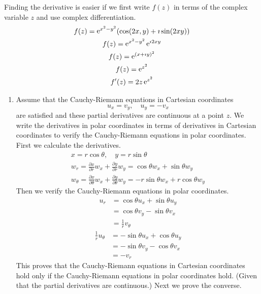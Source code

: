 {\begin{Solution}
\begin{enumerate}
    Finding the derivative is easier if we first write $f(z)$
    in terms of the complex variable $z$ and use complex differentiation.
    \begin{gather*}
      f(z) = \mathop{\mathrm{e}}\nolimits^{x^2 - y^2} ( \cos(2 x, y) + \imath \sin(2 x y) )
      \\
      f(z) = \mathop{\mathrm{e}}\nolimits^{x^2 - y^2} \mathop{\mathrm{e}}\nolimits^{\imath 2 x y}
      \\
      f(z) = \mathop{\mathrm{e}}\nolimits^{(x + \imath y)^2}
      \\
      f(z) = \mathop{\mathrm{e}}\nolimits^{z^2}
      \\
      f'(z) = 2 z \mathop{\mathrm{e}}\nolimits^{z^2}
    \end{gather*}
  \end{enumerate}
\end{Solution}









\begin{Solution}
  \label{solution cartesian cr polar cr}
  \begin{enumerate}
  \item 
    Assume that the Cauchy-Riemann equations in Cartesian coordinates
    \[
    u_x = v_y, \quad u_y = - v_x
    \]
    are satisfied and these partial derivatives are continuous at a point $z$.
    We write the derivatives in polar coordinates in terms of derivatives
    in Cartesian coordinates to verify the Cauchy-Riemann equations in 
    polar coordinates.  First we calculate the derivatives.
    \begin{gather*}
      x = r \cos \theta, \quad y = r \sin \theta
      \\    
      w_r = \frac{\partial x}{\partial r} w_x + \frac{\partial y}{\partial r} w_y
      = \cos \theta  w_x + \sin \theta  w_y
      \\
      w_\theta = \frac{\partial x}{\partial \theta} w_x + \frac{\partial y}{\partial \theta} w_y
      = -r \sin \theta  w_x + r \cos \theta  w_y
    \end{gather*}
    Then we verify the Cauchy-Riemann equations in polar coordinates.
    \begin{align*}
      u_r 
      &= \cos \theta  u_x + \sin \theta  u_y
      \\
      &= \cos \theta  v_y - \sin \theta  v_x
      \\
      &= \frac{1}{r} v_\theta
    \end{align*}
    \begin{align*}
      \frac{1}{r} u_\theta 
      &= - \sin \theta  u_x + \cos \theta  u_y
      \\
      &= - \sin \theta  v_y - \cos \theta  v_x
      \\
      &= - v_r
    \end{align*}
    This proves that the Cauchy-Riemann equations in Cartesian coordinates 
    hold only if the Cauchy-Riemann equations in polar coordinates hold.
    (Given that the partial derivatives are continuous.)  Next we prove the 
    converse.


\end{enumerate}
\end{Solution}}
